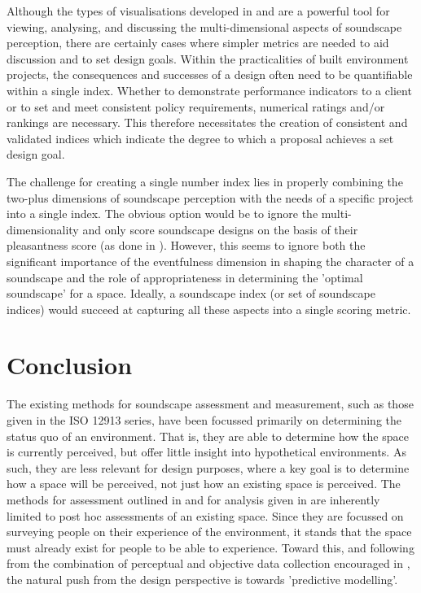 \documentclass[
  authoryear,
  preprint,
  1p]{elsarticle}
\begin{document}
Although the types of visualisations developed in
\citep{Mitchell2022How} and \citep{Cain2013development} are a powerful
tool for viewing, analysing, and discussing the multi-dimensional
aspects of soundscape perception, there are certainly cases where
simpler metrics are needed to aid discussion and to set design goals.
Within the practicalities of built environment projects, the
consequences and successes of a design often need to be quantifiable
within a single index. Whether to demonstrate performance indicators to
a client or to set and meet consistent policy requirements, numerical
ratings and/or rankings are necessary. This therefore necessitates the
creation of consistent and validated indices which indicate the degree
to which a proposal achieves a set design goal.

The challenge for creating a single number index lies in properly
combining the two-plus dimensions of soundscape perception with the
needs of a specific project into a single index. The obvious option
would be to ignore the multi-dimensionality and only score soundscape
designs on the basis of their pleasantness score (as done in
\citep{Ooi2022Probably}). However, this seems to ignore both the
significant importance of the eventfulness dimension in shaping the
character of a soundscape and the role of appropriateness in determining
the 'optimal soundscape' for a space. Ideally, a soundscape index (or
set of soundscape indices) would succeed at capturing all these aspects
into a single scoring metric.

\hypertarget{conclusion}{%
\section{Conclusion}\label{conclusion}}

The existing methods for soundscape assessment and measurement, such as
those given in the ISO 12913 series, have been focussed primarily on
determining the status quo of an environment. That is, they are able to
determine how the space is currently perceived, but offer little insight
into hypothetical environments. As such, they are less relevant for
design purposes, where a key goal is to determine how a space will be
perceived, not just how an existing space is perceived. The methods for
assessment outlined in \citet{ISO12913Part2} and for analysis given in
\citet{ISO12913Part3} are inherently limited to post hoc assessments of
an existing space. Since they are focussed on surveying people on their
experience of the environment, it stands that the space must already
exist for people to be able to experience. Toward this, and following
from the combination of perceptual and objective data collection
encouraged in \citet{ISO12913Part2}, the natural push from the design
perspective is towards 'predictive modelling'.


\renewcommand\refname{References}
  
\end{document}

